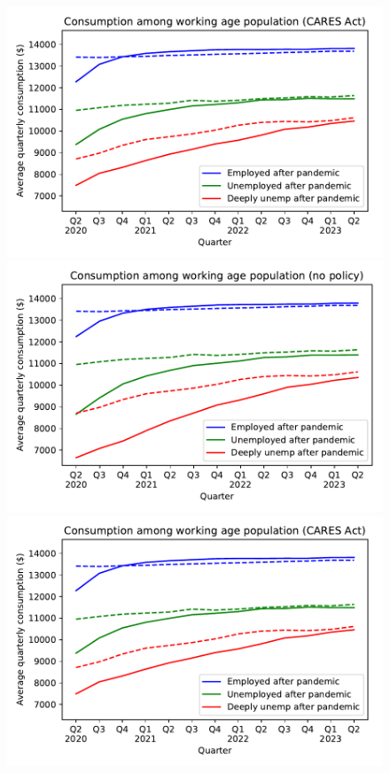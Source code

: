 \documentclass[titlepage,a4paper]{\econtex}
\begin{document}
\begin{figure}
{    \includegraphics[width=8in]{./Figures/ConRespByEmpStateWStim}
  } %
  { \includegraphics[width=8in]{./Figures/ConRespByEmpStateNoStim}
    \includegraphics[width=8in]{./Figures/ConRespByEmpStateWStim}}
\end{figure}
\end{document}
